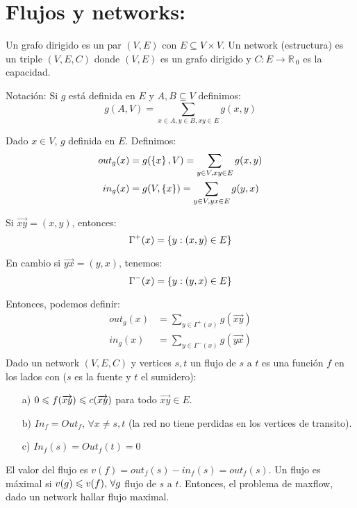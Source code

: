 \documentclass[12pt,a4paper]{article}
\begin{document}
\section{Flujos y networks:}

Un grafo dirigido es un par $(V,E)$ con $E \subseteq V \times V$. Un network (estructura) 
es un triple $(V,E,C)$ donde $(V,E)$ es un grafo dirigido y $C: E \to \mathbb{R}_{\>0}$ 
es la capacidad.
\medskip

Notación: Si $g$ está definida en $E$ y $A,B \subseteq V$ definimos:
$$g(A,V) = \sum_{x\in A,y\in B,xy \in E} g(x,y)$$

Dado $x \in V$, $g$ definida en $E$. Definimos:
\begin{align*}
    out_{g}(x) &= g(\left\lbrace x \right\rbrace,V) = \sum_{y \in V, xy \in E} g(x,y)\\
    in_{g}(x) &= g(V,\left\lbrace x \right\rbrace) = \sum_{y \in V, yx \in E} g(y,x)\\
\end{align*}

Si $\overrightarrow{xy} = (x,y)$, entonces:
$$\Gamma^{+}(x) = \left\lbrace y : (x,y) \in E \right\rbrace$$

En cambio si $\overrightarrow{yx} = (y,x)$, tenemos:
$$\Gamma^{-}(x) = \left\lbrace y : (y,x) \in E \right\rbrace $$

Entonces, podemos definir:
\begin{align*}
    out_{g}(x) &= \sum_{y \in \Gamma^{+}(x)} g(\overrightarrow{xy})\\
    in_{g}(x) &= \sum_{y \in \Gamma^{-}(x)} g(\overrightarrow{yx})\\
\end{align*}
Dado un network $(V,E,C)$ y vertices $s,t$ un flujo de $s$ a $t$ es una función 
$f$ en los lados con ($s$ es la fuente y $t$ el sumidero):
\begin{itemize}
    \item [a)] $0 \leqslant f(\overrightarrow{xy}) \leqslant c(\overrightarrow{xy})$ para todo $\overrightarrow{xy} \in E$.
    \item [b)] $In_{f}=Out_{f}, \,\forall x \neq s,t$ (la red no tiene perdidas en los vertices de transito).
    \item [c)] $In_{f}(s) = Out_{f}(t) = 0$ 
\end{itemize}

El valor del flujo es $v(f) = out_{f}(s) - in_{f}(s) = out_{f}(s)$. Un flujo es 
máximal si $v(g) \leqslant v(f), \, \forall g$ flujo de $s$ a $t$. Entonces, el problema 
de maxflow, dado un network hallar flujo maximal.
\medskip
\end{document}
